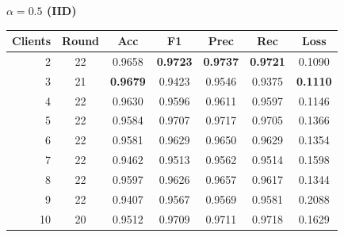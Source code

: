 \documentclass[conference]{IEEEtran}
\begin{document}
\begin{table}[t]
{    \begin{minipage}[t]{0.48\textwidth}
        \centering
        \textbf{$\alpha{=}0.5$ (IID)}\\[2pt]
        \begin{tabular}{rcccccc}
            \hline
            Clients & Round & Acc & F1 & Prec & Rec & Loss \\
            \hline
            2  & 22 & 0.9658 & \textbf{0.9723} & \textbf{0.9737} & \textbf{0.9721} & 0.1090 \\
            3  & 21 & \textbf{0.9679} & 0.9423 & 0.9546 & 0.9375 & \textbf{0.1110} \\
            4  & 22 & 0.9630 & 0.9596 & 0.9611 & 0.9597 & 0.1146 \\
            5  & 22 & 0.9584 & 0.9707 & 0.9717 & 0.9705 & 0.1366 \\
            6  & 22 & 0.9581 & 0.9629 & 0.9650 & 0.9629 & 0.1354 \\
            7  & 22 & 0.9462 & 0.9513 & 0.9562 & 0.9514 & 0.1598 \\
            8  & 22 & 0.9597 & 0.9626 & 0.9657 & 0.9617 & 0.1344 \\
            9  & 22 & 0.9407 & 0.9567 & 0.9569 & 0.9581 & 0.2088 \\
            10 & 20 & 0.9512 & 0.9709 & 0.9711 & 0.9718 & 0.1629 \\
            \hline
        \end{tabular}
    \end{minipage}}
\end{table}
\end{document}
